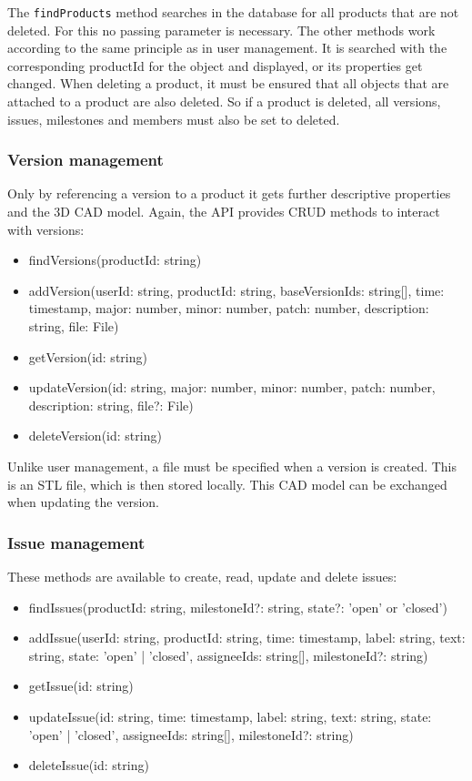     The \texttt{findProducts} method searches in the database for all products that are not deleted. For this no passing parameter is necessary. The other methods work according to the same principle as in user management. It is searched with the corresponding productId for the object and displayed, or its properties get changed. When deleting a product, it must be ensured that all objects that are attached to a product are also deleted. So if a product is deleted, all versions, issues, milestones and members must also be set to deleted.

    \subsubsection*{Version management}
    Only by referencing a version to a product it gets further descriptive properties and the 3D CAD model. Again, the API provides CRUD methods to interact with versions:

    \begin{itemize}
        \item findVersions(productId: string)
        \item addVersion(userId: string, productId: string, baseVersionIds: string[], time: timestamp, major: number, minor: number, patch: number, description: string, file: File)
        \item getVersion(id: string)
        \item updateVersion(id: string, major: number, minor: number, patch: number, description: string, file?: File)
        \item deleteVersion(id: string)
    \end{itemize}

    Unlike user management, a file must be specified when a version is created. This is an STL file, which is then stored locally. This CAD model can be exchanged when updating the version.

    \subsubsection*{Issue management} 
    These methods are available to create, read, update and delete issues:
    \begin{itemize}
        \item findIssues(productId: string, milestoneId?: string, state?: 'open' or 'closed')
        \item addIssue(userId: string, productId: string, time: timestamp, label: string, text: string, state: 'open' | 'closed', assigneeIds: string[], milestoneId?: string)
        \item getIssue(id: string)
        \item updateIssue(id: string, time: timestamp, label: string, text: string, state: 'open' | 'closed', assigneeIds: string[], milestoneId?: string)
        \item deleteIssue(id: string)
    \end{itemize}

